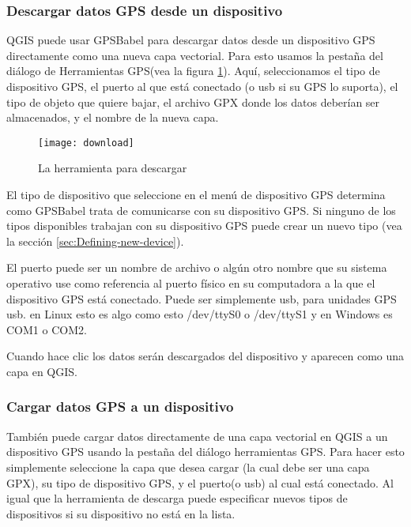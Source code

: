 \subsubsection{Descargar datos GPS desde un dispositivo}

QGIS puede usar GPSBabel para descargar datos desde un dispositivo GPS directamente como una nueva capa vectorial.
Para esto usamos la pestaña  del diálogo de Herramientas GPS(vea la figura \ref{figure_download}). Aquí, seleccionamos el tipo de dispositivo GPS, el puerto al que está conectado (o usb si su GPS lo suporta), el tipo de objeto que quiere bajar, el archivo GPX donde los datos deberían ser almacenados, y el nombre de la nueva capa.

\begin{figure}[ht]
   \begin{center}
\caption{\label{figure_download}La herramienta para descargar \nixcaption}
\texttt{[image: download]}
   \end{center}
\end{figure}

El tipo de dispositivo que seleccione en el menú de dispositivo GPS determina como GPSBabel trata de comunicarse con su dispositivo GPS.
Si ninguno de los tipos disponibles trabajan con su dispositivo GPS puede crear un nuevo tipo (vea la sección \ref{sec:Defining-new-device}).

El puerto puede ser un nombre de archivo o algún otro nombre que su sistema operativo use como referencia al puerto físico en su computadora a la que el dispositivo GPS está conectado. Puede ser simplemente usb, para unidades GPS usb.
\nix en Linux esto es algo como esto /dev/ttyS0 o /dev/ttyS1 y en \win Windows es COM1 o COM2.

Cuando hace clic  los datos serán descargados del dispositivo y aparecen como una capa en QGIS.

\subsubsection{Cargar datos GPS a un dispositivo}

También puede cargar datos directamente de una capa vectorial en QGIS a un dispositivo GPS usando la pestaña  del diálogo herramientas GPS. Para hacer esto simplemente seleccione la capa que desea cargar (la cual debe ser una capa GPX), 
su tipo de dispositivo GPS, y el puerto(o usb) al cual está conectado.
Al igual que la herramienta de descarga puede especificar nuevos tipos de dispositivos si su dispositivo no está en la lista.

